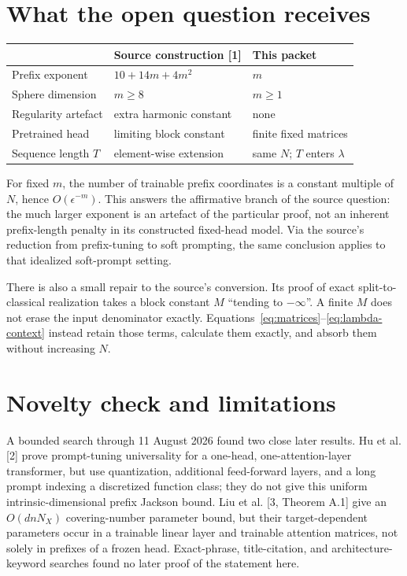 \documentclass[11pt]{article}
\begin{document}
\section{What the open question receives}

\begin{center}
\begin{tabular}{@{}lll@{}}
\toprule
 & Source construction [1] & This packet \\
\midrule
Prefix exponent & $10+14m+4m^2$ & $m$ \\
Sphere dimension & $m\ge8$ & $m\ge1$ \\
Regularity artefact & extra harmonic constant & none \\
Pretrained head & limiting block constant & finite fixed matrices \\
Sequence length $T$ & element-wise extension & same $N$; $T$ enters $\lambda$ \\
\bottomrule
\end{tabular}
\end{center}

For fixed $m$, the number of trainable prefix coordinates is a constant
multiple of $N$, hence $O(\epsilon^{-m})$.  This answers the affirmative
branch of the source question: the much larger exponent is an artefact of the
particular proof, not an inherent prefix-length penalty in its constructed
fixed-head model.  Via the source's reduction from prefix-tuning to soft
prompting, the same conclusion applies to that idealized soft-prompt setting.

There is also a small repair to the source's conversion.  Its proof of exact
split-to-classical realization takes a block constant $M$ ``tending to
$-\infty$''.  A finite $M$ does not erase the input denominator exactly.
Equations~\eqref{eq:matrices}--\eqref{eq:lambda-context} instead retain those
terms, calculate them exactly, and absorb them without increasing $N$.

\section{Novelty check and limitations}

A bounded search through 11 August 2026 found two close later results.  Hu et
al. [2] prove prompt-tuning universality for a one-head, one-attention-layer
transformer, but use quantization, additional feed-forward layers, and a long
prompt indexing a discretized function class; they do not give this uniform
intrinsic-dimensional prefix Jackson bound.  Liu et al. [3, Theorem A.1] give
an $O(dnN_X)$ covering-number parameter bound, but their target-dependent
parameters occur in a trainable linear layer and trainable attention matrices,
not solely in prefixes of a frozen head.  Exact-phrase, title-citation, and
architecture-keyword searches found no later proof of the statement here.
\end{document}
